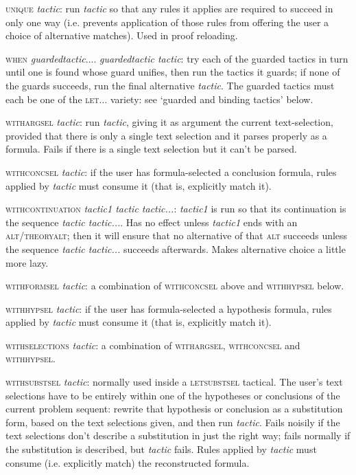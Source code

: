 \textsc{unique} \textit{tactic}: run \textit{tactic} so that any rules it applies are required to succeed in only one way (i.e. prevents application of those rules from offering the user a choice of alternative matches). Used in proof reloading.


\textsc{when} \textit{guardedtactic}.... \textit{guardedtactic tactic}: try each of the guarded tactics in turn until one is found whose guard unifies, then run the tactics it guards; if none of the guards succeeds, run the final alternative \textit{tactic}. The guarded tactics must each be one of the \textsc{let...} variety: see `guarded and binding tactics' below.


\textsc{withargsel} \textit{tactic}: run \textit{tactic}, giving it as argument the current text-selection, provided that there is only a single text selection and it parses properly as a formula. Fails if there is a single text selection but it can't be parsed.


\textsc{withconcsel} \textit{tactic}: if the user has formula-selected a conclusion formula, rules applied by \textit{tactic} must consume it (that is, explicitly match it).


\textsc{withcontinuation} \textit{tactic1 tactic tactic...}: \textit{tactic1} is run so that its continuation is the sequence \textit{tactic tactic...}. Has no effect unless \textit{tactic1} ends with an \textsc{alt/theoryalt}; then it will ensure that no alternative of that \textsc{alt} succeeds unless the sequence \textit{tactic tactic...} succeeds afterwards. Makes alternative choice a little more lazy.


\textsc{withformsel} \textit{tactic}: a combination of \textsc{withconcsel} above and \textsc{withhypsel} below.


\textsc{withhypsel} \textit{tactic}: if the user has formula-selected a hypothesis formula, rules applied by \textit{tactic} must consume it (that is, explicitly match it).


\textsc{withselections} \textit{tactic}: a combination of \textsc{withargsel}, \textsc{withconcsel} and \textsc{withhypsel}.


\textsc{withsubstsel} \textit{tactic}: normally used inside a \textsc{letsubstsel} tactical. The user's text selections have to be entirely within one of the hypotheses or conclusions of the current problem sequent: rewrite that hypothesis or conclusion as a substitution form, based on the text selections given, and then run \textit{tactic}. Fails noisily if the text selections don't describe a substitution in just the right way; fails normally if the substitution is described, but \textit{tactic} fails. Rules applied by \textit{tactic} must consume (i.e. explicitly match) the reconstructed formula.


